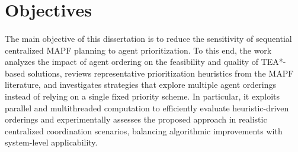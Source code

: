 \section{Objectives}
\paragraph{}

The main objective of this dissertation is to reduce the sensitivity of sequential centralized MAPF planning to agent prioritization. To this end, the work analyzes the impact of agent ordering on the feasibility and quality of TEA*-based solutions, reviews representative prioritization heuristics from the MAPF literature, and investigates strategies that explore multiple agent orderings instead of relying on a single fixed priority scheme. In particular, it exploits parallel and multithreaded computation to efficiently evaluate heuristic-driven orderings and experimentally assesses the proposed approach in realistic centralized coordination scenarios, balancing algorithmic improvements with system-level applicability.
